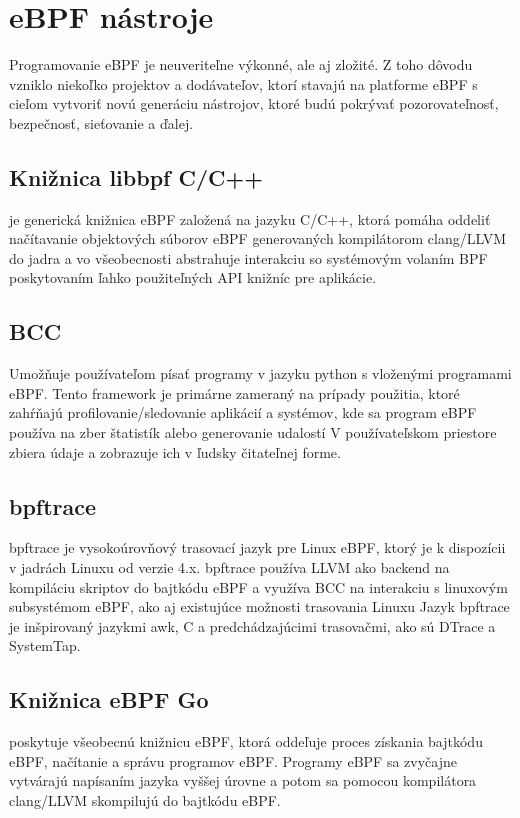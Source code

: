 \section{eBPF nástroje}
Programovanie eBPF je neuveriteľne výkonné, ale aj zložité. Z toho dôvodu vzniklo niekoľko projektov a dodávateľov, ktorí stavajú na platforme eBPF s cieľom vytvoriť novú generáciu nástrojov, ktoré budú pokrývať pozorovateľnosť, bezpečnosť, sieťovanie a ďalej.

\subsection*{Knižnica libbpf C/C++}
je generická knižnica eBPF založená na jazyku C/C++, ktorá pomáha oddeliť načítavanie objektových súborov eBPF generovaných kompilátorom clang/LLVM do jadra a vo všeobecnosti abstrahuje interakciu so systémovým volaním BPF poskytovaním ľahko použiteľných API knižníc pre aplikácie.

\subsection*{BCC}
Umožňuje používateľom písať programy v jazyku python s vloženými programami eBPF.  
Tento framework je primárne zameraný na prípady použitia, ktoré zahŕňajú profilovanie/sledovanie aplikácií a systémov, kde sa program eBPF používa na zber štatistík alebo generovanie udalostí
V používateľskom priestore zbiera údaje a zobrazuje ich v ľudsky čitateľnej forme. 

\subsection*{bpftrace}
bpftrace je vysokoúrovňový trasovací jazyk pre Linux eBPF, ktorý je k dispozícii v jadrách Linuxu od verzie 4.x. 
bpftrace používa LLVM ako backend na kompiláciu skriptov do bajtkódu eBPF a využíva BCC na interakciu s linuxovým subsystémom eBPF, ako aj existujúce možnosti trasovania Linuxu
Jazyk bpftrace je inšpirovaný jazykmi awk, C a predchádzajúcimi trasovačmi, ako sú DTrace a SystemTap.

\subsection*{Knižnica eBPF Go}
poskytuje všeobecnú knižnicu eBPF, ktorá oddeľuje proces získania bajtkódu eBPF, načítanie a správu programov eBPF. 
Programy eBPF sa zvyčajne vytvárajú napísaním jazyka vyššej úrovne a potom sa pomocou kompilátora clang/LLVM skompilujú do bajtkódu eBPF.

